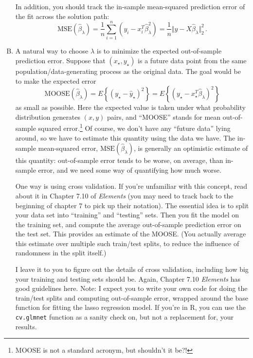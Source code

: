 \documentclass{article}
\begin{document}
\begin{enumerate}[(A)]
In addition, you should track the in-sample mean-squared prediction error of the fit across the solution path:
$$
\mathrm{MSE}(\hat \beta_{\lambda}) = \frac{1}{n} \sum_{i=1}^n (y_i - x_i^T \hat \beta_{\lambda}^2) = \frac{1}{n} \Vert y - X \hat \beta_{\lambda} \Vert_2^2 \, .
$$

\item A natural way to choose $\lambda$ is to minimize the expected out-of-sample prediction error.  Suppose that $(x_{\star}, y_{\star})$ is a future data point from the same population/data-generating process as the original data.  The goal would be to make the expected error
$$
\mathrm{MOOSE}(\hat{\beta}_{\lambda}) =  E \left\{ (y_{\star} - \hat{y}_{\star} )^2 \right\} = E \left\{ (y_{\star} - x_\star^T \hat{\beta}_{\lambda} )^2 \right\} 
$$
as small as possible.  Here the expected value is taken under what probability distribution generates $(x,y)$ pairs, and ``MOOSE'' stands for mean out-of-sample squared error.\footnote{MOOSE is not a standard acronym, but shouldn't it be?!}  Of course, we don't have any ``future data'' lying around, so we have to estimate this quantity using the data we have.  The in-sample mean-squared error, $\mathrm{MSE}(\hat \beta_{\lambda})$, is generally an optimistic estimate of this quantity: out-of-sample error tends to be worse, on average, than in-sample error, and we need some way of quantifying how much worse.

One way is using cross validation.  If you're unfamiliar with this concept, read about it in Chapter 7.10 of \textit{Elements} (you may need to track back to the beginning of chapter 7 to pick up their notation).  The essential idea is to split your data set into ``training'' and ``testing'' sets.  Then you fit the model on the training set, and compute the average out-of-sample prediction error on the test set.  This provides an estimate of the MOOSE.  (You actually average this estimate over multiple such train/test splits, to reduce the influence of randomness in the split itself.)

I leave it to you to figure out the details of cross validation, including how big your training and testing sets should be.  Again, Chapter 7.10 \textit{Elements} has good guidelines here.  Note: I expect you to write your own code for doing the train/test splits and computing out-of-sample error, wrapped around the base function for fitting the lasso regression model.   If you're in R, you can use the \verb|cv.glmnet| function as a sanity check on, but not a replacement for, your results.


\end{enumerate}
\end{document}
